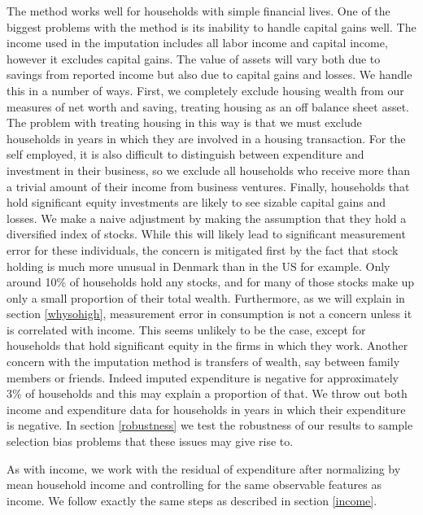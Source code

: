\documentclass[titlepage]{\econtex}\newcommand{\texname}{ConsumptionHeterogeneity}
\begin{document}
The method works well for households with simple financial lives. One of the biggest problems with the method is its inability to handle capital gains well. The income used in the imputation includes all labor income and capital income, however it excludes capital gains. The value of assets will vary both due to savings from reported income but also due to capital gains and losses. We handle this in a number of ways. First, we completely exclude housing wealth from our measures of net worth and saving, treating housing as an off balance sheet asset. The problem with treating housing in this way is that we must exclude households in years in which they are involved in a housing transaction. For the self employed, it is also difficult to distinguish between expenditure and investment in their business, so we exclude all households who receive more than a trivial amount of their income from business ventures. Finally, households that hold significant equity investments are likely to see sizable capital gains and losses. We make a naive adjustment by making the assumption that they hold a diversified index of stocks. While this will likely lead to significant measurement error for these individuals, the concern is mitigated first by the fact that stock holding is much more unusual in Denmark than in the US for example. Only around 10\% of households hold any stocks, and for many of those stocks make up only a small proportion of their total wealth. Furthermore, as we will explain in section \ref{whysohigh}, measurement error in consumption is not a concern unless it is correlated with income. This seems unlikely to be the case, except for households that hold significant equity in the firms in which they work. Another concern with the imputation method is transfers of wealth, say between family members or friends. Indeed imputed expenditure is negative for approximately 3\% of households and this may explain a proportion of that. We throw out both income and expenditure data for households in years in which their expenditure is negative. In section \ref{robustness} we test the robustness of our results to sample selection bias problems that these issues may give rise to.

As with income, we work with the residual of expenditure after normalizing by mean household income and controlling for the same observable features as income. We follow exactly the same steps as described in section \ref{income}.
\end{document}
